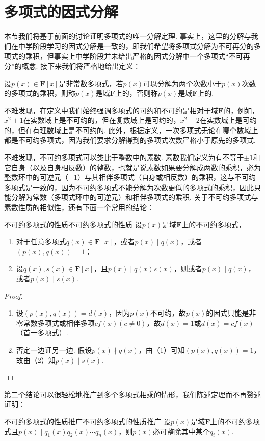 \section{多项式的因式分解}
本节我们将基于前面的讨论证明多项式的唯一分解定理. 事实上，这里的分解与我们在中学阶段学习的因式分解是一致的，即我们希望将多项式分解为不可再分的多项式的乘积，但事实上中学阶段并未给出严格的因式分解中一个多项式``不可再分''的概念. 接下来我们将严格地给出定义：
\begin{definition}{}{}
    设$p(x)\in\mathbf{F}[x]$是非常数多项式，若$p(x)$可以分解为两个次数小于$p(x)$次数的多项式的乘积，则称$p(x)$是域$\mathbf{F}$上的，否则称$p(x)$是域$\mathbf{F}$上的.
\end{definition}

不难发现，在定义中我们始终强调多项式的可约和不可约是相对于域$\mathbf{F}$的，例如，$x^2+1$在实数域上是不可约的，但在复数域上是可约的，$x^2-2$在实数域上是可约的，但在有理数域上是不可约的. 此外，根据定义，一次多项式无论在哪个数域上都是不可约多项式，因为我们要求分解得到的多项式次数严格小于原先的多项式.

不难发现，不可约多项式可以类比于整数中的素数. 素数我们定义为有不等于$\pm 1$和它自身（以及自身相反数）的整数，也就是说素数如果要分解成两数的乘积，必为整数环中的可逆元（$\pm 1$）与其相伴多项式（自身或相反数）的乘积，这与不可约多项式是一致的，因为不可约多项式不能分解为次数更低的多项式的乘积，因此只能分解为常数（多项式环中的可逆元）和相伴多项式的乘积. 关于不可约多项式与素数性质的相似性，还有下面一个常用的结论：
\begin{theorem}{不可约多项式的性质}{不可约多项式的性质}
    设$p(x)$是域$\mathbf{F}$上的不可约多项式，
    \begin{enumerate}
        \item 对于任意多项式$q(x)\in\mathbf{F}[x]$，或者$p(x)\mid q(x)$，或者$(p(x),q(x))=1$；
        \item 设$q(x),s(x)\in\mathbf{F}[x]$，且$p(x)\mid q(x)s(x)$，则或者$p(x)\mid q(x)$，或者$p(x)\mid s(x)$.
    \end{enumerate}
\end{theorem}
\begin{proof}
    \begin{enumerate}
        \item 设$(p(x),q(x))=d(x)$，因为$p(x)$不可约，故$p(x)$的因式只能是非零常数多项式或相伴多项$cf(x)(c\neq 0)$，故$d(x)=1$或$d(x)=cf(x)$（首一多项式）.
        \item 否定一边证另一边. 假设$p(x)\nmid q(x)$，由（1）可知$(p(x),q(x))=1$，故由（2）知$p(x)\mid s(x)$.
    \end{enumerate}
\end{proof}
第二个结论可以很轻松地推广到多个多项式相乘的情形，我们陈述定理而不再赘述证明：
\begin{corollary}{不可约多项式的性质推广}{不可约多项式的性质推广}
    设$p(x)$是域$\mathbf{F}$上的不可约多项式且$p(x)\mid q_1(x)q_2(x)\cdots q_n(x)$，则$p(x)$必可整除其中某个$q_i(x)$.
\end{corollary}

